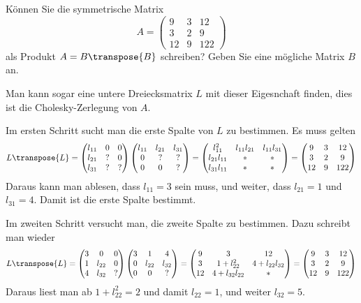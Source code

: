 Können Sie die symmetrische Matrix
\[
A=\begin{pmatrix}
 9& 3& 12\\
 3& 2&  9\\
12& 9&122
\end{pmatrix}
\]
als Produkt $A=B\transpose{B}$ schreiben? Geben Sie eine mögliche Matrix $B$ an.


\begin{loesung}
Man kann sogar eine untere Dreiecksmatrix $L$ mit dieser Eigesnchaft finden,
dies ist die Cholesky-Zerlegung von $A$.

Im ersten Schritt sucht man die erste Spalte von $L$ zu bestimmen.
Es muss gelten
\[
L\transpose{L}=
\begin{pmatrix}
l_{11}&  0&  0\\
l_{21}&  ?&  0\\
l_{31}&  ?&  ?
\end{pmatrix}
\begin{pmatrix}
l_{11}&l_{21}&l_{31}\\
     0&     ?&     ?\\
     0&     0&     ?
\end{pmatrix}
=
\begin{pmatrix}
    l_{11}^2&l_{11}l_{21}&l_{11}l_{31}\\
l_{21}l_{11}&           *&           *\\
l_{31}l_{11}&           *&           *
\end{pmatrix}
=
\begin{pmatrix}
 9& 3& 12\\
 3& 2&  9\\
12& 9&122
\end{pmatrix}
\]
Daraus kann man ablesen, dass $l_{11}=3$ sein muss, und weiter,
dass
$l_{21}=1$ und $l_{31}=4$. Damit ist die erste Spalte bestimmt.

Im zweiten Schritt versucht man, die zweite Spalte zu bestimmen.
Dazu schreibt man wieder
\[
L\transpose{L}
=
\begin{pmatrix}
3&     0&0\\
1&l_{22}&0\\
4&l_{32}&?
\end{pmatrix}
\begin{pmatrix}
3&     1&     4\\
0&l_{22}&l_{32}\\
0&     0&?
\end{pmatrix}
=
\begin{pmatrix}
 9&3           &          12\\
 3& 1+l_{22}^2  &4+l_{22}l_{32}\\
12& 4+l_{32}l_{22}&         *
\end{pmatrix}
=
\begin{pmatrix}
 9& 3& 12\\
 3& 2&  9\\
12& 9&122
\end{pmatrix}
\]
Daraus liest man ab $1+l_{22}^2=2$ und damit $l_{22}=1$, und weiter
$l_{32}=5$.


\end{loesung}
